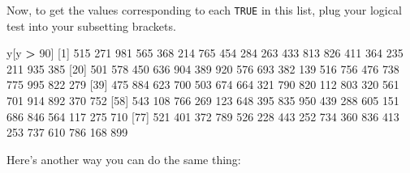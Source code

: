 \documentclass[
]{book}
\newenvironment{Shaded}{\begin{snugshade}}{\end{snugshade}}
\newcommand{\DecValTok}[1]{\textcolor[rgb]{0.00,0.00,0.81}{#1}}
\newcommand{\NormalTok}[1]{#1}
\newcommand{\OperatorTok}[1]{\textcolor[rgb]{0.81,0.36,0.00}{\textbf{#1}}}
\newcommand{\StringTok}[1]{\textcolor[rgb]{0.31,0.60,0.02}{#1}}
\begin{document}
Now, to get the values corresponding to each \texttt{TRUE} in this list, plug your logical test into your subsetting brackets.

\begin{Shaded}
\begin{Highlighting}[]
\NormalTok{y[y }\OperatorTok{>}\StringTok{ }\DecValTok{90}\NormalTok{]}
\NormalTok{ [}\DecValTok{1}\NormalTok{] }\DecValTok{515} \DecValTok{271} \DecValTok{981} \DecValTok{565} \DecValTok{368} \DecValTok{214} \DecValTok{765} \DecValTok{454} \DecValTok{284} \DecValTok{263} \DecValTok{433} \DecValTok{813} \DecValTok{826} \DecValTok{411} \DecValTok{364} \DecValTok{235} \DecValTok{211} \DecValTok{935} \DecValTok{385}
\NormalTok{[}\DecValTok{20}\NormalTok{] }\DecValTok{501} \DecValTok{578} \DecValTok{450} \DecValTok{636} \DecValTok{904} \DecValTok{389} \DecValTok{920} \DecValTok{576} \DecValTok{693} \DecValTok{382} \DecValTok{139} \DecValTok{516} \DecValTok{756} \DecValTok{476} \DecValTok{738} \DecValTok{775} \DecValTok{995} \DecValTok{822} \DecValTok{279}
\NormalTok{[}\DecValTok{39}\NormalTok{] }\DecValTok{475} \DecValTok{884} \DecValTok{623} \DecValTok{700} \DecValTok{503} \DecValTok{674} \DecValTok{664} \DecValTok{321} \DecValTok{790} \DecValTok{820} \DecValTok{112} \DecValTok{803} \DecValTok{320} \DecValTok{561} \DecValTok{701} \DecValTok{914} \DecValTok{892} \DecValTok{370} \DecValTok{752}
\NormalTok{[}\DecValTok{58}\NormalTok{] }\DecValTok{543} \DecValTok{108} \DecValTok{766} \DecValTok{269} \DecValTok{123} \DecValTok{648} \DecValTok{395} \DecValTok{835} \DecValTok{950} \DecValTok{439} \DecValTok{288} \DecValTok{605} \DecValTok{151} \DecValTok{686} \DecValTok{846} \DecValTok{564} \DecValTok{117} \DecValTok{275} \DecValTok{710}
\NormalTok{[}\DecValTok{77}\NormalTok{] }\DecValTok{521} \DecValTok{401} \DecValTok{372} \DecValTok{789} \DecValTok{526} \DecValTok{228} \DecValTok{443} \DecValTok{252} \DecValTok{734} \DecValTok{360} \DecValTok{836} \DecValTok{413} \DecValTok{253} \DecValTok{737} \DecValTok{610} \DecValTok{786} \DecValTok{168} \DecValTok{899}
\end{Highlighting}
\end{Shaded}

Here's another way you can do the same thing:
\end{document}
